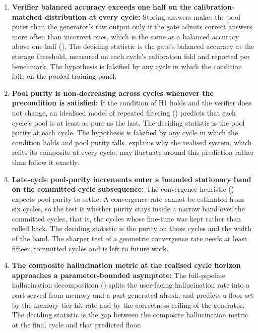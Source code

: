 \begin{enumerate}
\item \textbf{Verifier balanced accuracy exceeds one half on the calibration-matched distribution at every cycle:} Storing answers makes the pool purer than the generator's raw output only if the gate admits correct answers more often than incorrect ones, which is the same as a balanced accuracy above one half (). The deciding statistic is the gate's balanced accuracy at the storage threshold, measured on each cycle's calibration fold and reported per benchmark. The hypothesis is falsified by any cycle in which the condition fails on the pooled training panel.

\item \textbf{Pool purity is non-decreasing across cycles whenever the precondition is satisfied:} If the condition of H1 holds and the verifier does not change, an idealised model of repeated filtering () predicts that each cycle's pool is at least as pure as the last. The deciding statistic is the pool purity at each cycle. The hypothesis is falsified by any cycle in which the condition holds and pool purity falls.  explains why the realised system, which refits its composite at every cycle, may fluctuate around this prediction rather than follow it exactly.

\item \textbf{Late-cycle pool-purity increments enter a bounded stationary band on the committed-cycle subsequence:} The convergence heuristic () expects pool purity to settle. A convergence rate cannot be estimated from six cycles, so the test is whether purity stays inside a narrow band over the committed cycles, that is, the cycles whose fine-tune was kept rather than rolled back. The deciding statistic is the purity on those cycles and the width of the band. The sharper test of a geometric convergence rate needs at least fifteen committed cycles and is left to future work.

\item \textbf{The composite hallucination metric at the realised cycle horizon approaches a parameter-bounded asymptote:} The full-pipeline hallucination decomposition () splits the user-facing hallucination rate into a part served from memory and a part generated afresh, and predicts a floor set by the memory-tier hit rate and by the correctness ceiling of the generator. The deciding statistic is the gap between the composite hallucination metric at the final cycle and that predicted floor.
\end{enumerate}

